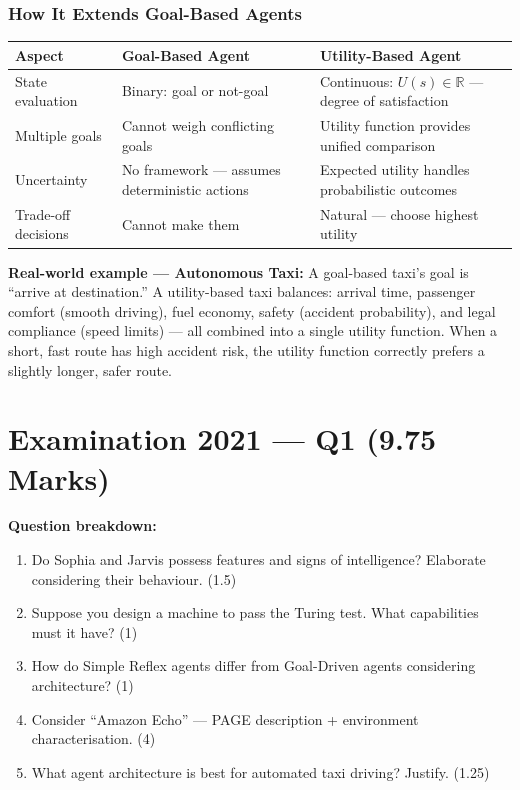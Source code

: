 \documentclass[12pt, a4paper]{article}
\newenvironment{solutionbox}{\begin{mdframed}[style=solutionframe]}{\end{mdframed}}
\newenvironment{notesbox}{\begin{mdframed}[style=notesframe]}{\end{mdframed}}
\begin{document}
\subsubsection*{How It Extends Goal-Based Agents}

\begin{center}
\renewcommand{\arraystretch}{1.3}
\begin{tabular}{l|p{6cm}|p{6cm}}
\toprule
\textbf{Aspect} & \textbf{Goal-Based Agent} & \textbf{Utility-Based Agent} \\
\midrule
State evaluation & Binary: goal or not-goal & Continuous: $U(s) \in \mathbb{R}$ — degree of satisfaction \\
Multiple goals & Cannot weigh conflicting goals & Utility function provides unified comparison \\
Uncertainty & No framework — assumes deterministic actions & Expected utility handles probabilistic outcomes \\
Trade-off decisions & Cannot make them & Natural — choose highest utility \\
\bottomrule
\end{tabular}
\end{center}

\begin{notesbox}
\textbf{Real-world example — Autonomous Taxi:} A goal-based taxi's goal is ``arrive at destination.'' A utility-based taxi balances: arrival time, passenger comfort (smooth driving), fuel economy, safety (accident probability), and legal compliance (speed limits) — all combined into a single utility function. When a short, fast route has high accident risk, the utility function correctly prefers a slightly longer, safer route.
\end{notesbox}

\newpage

\section{Examination 2021 — Q1 (9.75 Marks)}

\begin{solutionbox}
\textbf{Question breakdown:}
\begin{enumerate}[noitemsep]
  \item[(a)] Do Sophia and Jarvis possess features and signs of intelligence? Elaborate considering their behaviour. (1.5)
  \item[(b)] Suppose you design a machine to pass the Turing test. What capabilities must it have? (1)
  \item[(c)] How do Simple Reflex agents differ from Goal-Driven agents considering architecture? (1)
  \item[(d)] Consider ``Amazon Echo'' — PAGE description + environment characterisation. (4)
  \item[(e)] What agent architecture is best for automated taxi driving? Justify. (1.25)
\end{enumerate}
\end{solutionbox}
\end{document}
